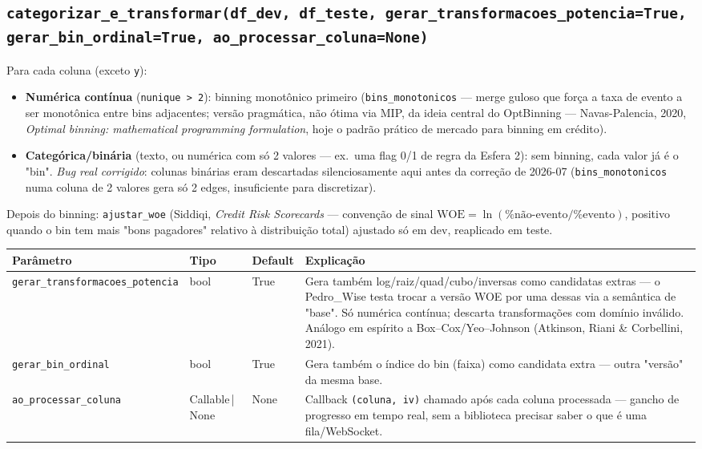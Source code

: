 \documentclass[11pt]{article}
\begin{document}
\subsection*{\texttt{categorizar\_e\_transformar(df\_dev, df\_teste, gerar\_transformacoes\_potencia=True, gerar\_bin\_ordinal=True, ao\_processar\_coluna=None)}}

Para cada coluna (exceto \texttt{y}):

\begin{itemize}[leftmargin=1.2cm]
\item \textbf{Numérica contínua} (\texttt{nunique > 2}): binning monotônico
primeiro (\texttt{bins\_monotonicos} --- merge guloso que força a taxa de
evento a ser monotônica entre bins adjacentes; versão pragmática, não ótima
via MIP, da ideia central do OptBinning ---
Navas-Palencia, 2020,
\emph{Optimal binning: mathematical programming formulation},
hoje o padrão prático de mercado para binning em crédito).
\item \textbf{Categórica/binária} (texto, ou numérica com só 2 valores ---
ex.\ uma flag 0/1 de regra da Esfera 2): sem binning, cada valor já é o
"bin". \emph{Bug real corrigido}: colunas binárias eram descartadas
silenciosamente aqui antes da correção de 2026-07 (\texttt{bins\_monotonicos}
numa coluna de 2 valores gera só 2 edges, insuficiente para discretizar).
\end{itemize}

Depois do binning: \texttt{ajustar\_woe} (Siddiqi, \emph{Credit Risk
Scorecards} --- convenção de sinal $\mathrm{WOE} = \ln(\%\text{não-evento} /
\%\text{evento})$, positivo quando o bin tem mais "bons pagadores" relativo
à distribuição total) ajustado só em dev, reaplicado em teste.

\begin{longtable}{P{4.2cm}P{2cm}P{1.6cm}P{6cm}}
\toprule
\textbf{Parâmetro} & \textbf{Tipo} & \textbf{Default} & \textbf{Explicação} \\
\midrule
\endhead
\texttt{gerar\_transformacoes\_potencia} & bool & True & Gera também log/raiz/quad/cubo/inversas como candidatas extras --- o Pedro\_Wise testa trocar a versão WOE por uma dessas via a semântica de "base". Só numérica contínua; descarta transformações com domínio inválido. Análogo em espírito a Box--Cox/Yeo--Johnson (Atkinson, Riani \& Corbellini, 2021). \\
\texttt{gerar\_bin\_ordinal} & bool & True & Gera também o índice do bin (faixa) como candidata extra --- outra "versão" da mesma base. \\
\texttt{ao\_processar\_coluna} & Callable\,|\,None & None & Callback \texttt{(coluna, iv)} chamado após cada coluna processada --- gancho de progresso em tempo real, sem a biblioteca precisar saber o que é uma fila/WebSocket. \\
\bottomrule
\end{longtable}
\end{document}

